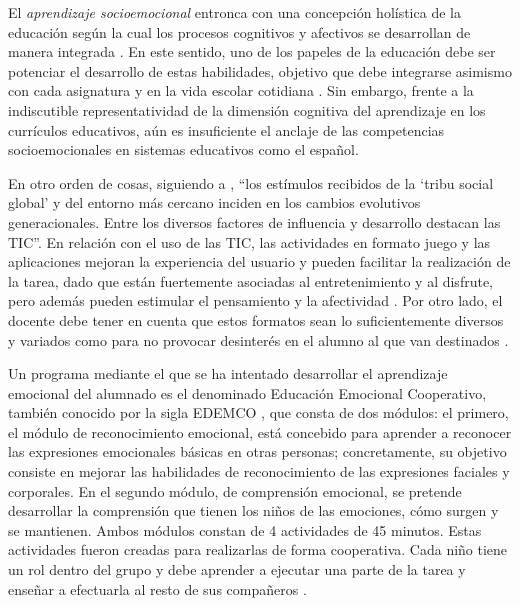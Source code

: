 \documentclass[spanish]{textolivre}
\begin{document}
El \textit{aprendizaje socioemocional} entronca con una concepción holística de la educación según la cual los procesos cognitivos y afectivos se desarrollan de manera integrada \cite{grund_emotional_2023}. En este sentido, uno de los papeles de la educación debe ser potenciar el desarrollo de estas habilidades, objetivo que debe integrarse asimismo con cada asignatura y en la vida escolar cotidiana \cite{jones_social_2012}. Sin embargo, frente a la indiscutible representatividad de la dimensión cognitiva del aprendizaje en los currículos educativos, aún es insuficiente el anclaje de las competencias socioemocionales en sistemas educativos como el español.

En otro orden de cosas, siguiendo a \textcite{reyero_saez_educacion_2019}, “los estímulos recibidos de la ‘tribu social global’ y del entorno más cercano inciden en los cambios evolutivos generacionales. Entre los diversos factores de influencia y desarrollo destacan las TIC”. En relación con el uso de las TIC, las actividades en formato juego y las aplicaciones mejoran la experiencia del usuario y pueden facilitar la realización de la tarea, dado que están fuertemente asociadas al entretenimiento y al disfrute, pero además pueden estimular el pensamiento y la afectividad \cite{norman_emotion_2002}. Por otro lado, el docente debe tener en cuenta que estos formatos sean lo suficientemente diversos y variados como para no provocar desinterés en el alumno al que van destinados \cite{pagulayan_user-centered_2003}. 

Un programa mediante el que se ha intentado desarrollar el aprendizaje emocional del alumnado es el denominado Educación Emocional Cooperativo, también conocido por la sigla EDEMCO \cite{ambrona_benito_eficacia_2012}, que consta de dos módulos: el primero, el módulo de reconocimiento emocional, está concebido para aprender a reconocer las expresiones emocionales básicas en otras personas; concretamente, su objetivo consiste en mejorar las habilidades de reconocimiento de las expresiones faciales y corporales. En el segundo módulo, de comprensión emocional, se pretende desarrollar la comprensión que tienen los niños de las emociones, cómo surgen y se mantienen. Ambos módulos constan de 4 actividades de 45 minutos. Estas actividades fueron creadas para realizarlas de forma cooperativa. Cada niño tiene un rol dentro del grupo y debe aprender a ejecutar una parte de la tarea y enseñar a efectuarla al resto de sus compañeros \cite{aronson_cooperation_1980}. 
\end{document}
